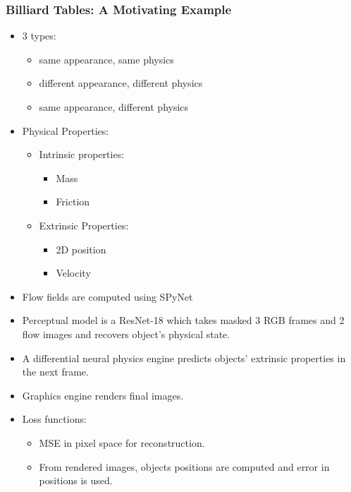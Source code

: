 \documentclass{article}
\begin{document}
    \subsubsection{Billiard Tables: A Motivating Example}\label{subsubsec:Learning_to_See_Physics_via_Visual_De_animation:synthetic-billiards}
    \begin{itemize}
        \item 3 types:
        \begin{itemize}
            \item same appearance, same physics
            \item different appearance, different physics
            \item same appearance, different physics
        \end{itemize}
        \item Physical Properties:
        \begin{itemize}
            \item Intrinsic properties:
            \begin{itemize}
                \item Mass
                \item Friction
            \end{itemize}
            \item Extrinsic Properties:
            \begin{itemize}
                \item 2D position
                \item Velocity
            \end{itemize}
        \end{itemize}
        \item Flow fields are computed using SPyNet
        \item Perceptual model is a ResNet-18 which takes masked 3 RGB frames and 2 flow images and recovers object's physical state.
        \item A differential neural physics engine predicts objects' extrinsic properties in the next frame.
        \item Graphics engine renders final images.
        \item Loss functions:
        \begin{itemize}
            \item MSE in pixel space for reconstruction.
            \item From rendered images, objects positions are computed and error in positions is used.

\end{itemize}
\end{itemize}
\end{document}

